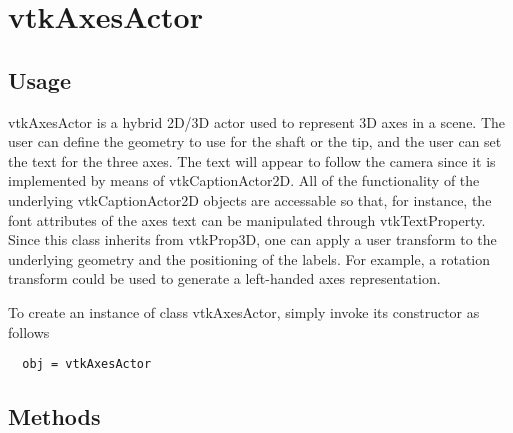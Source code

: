 \section{vtkAxesActor}

\subsection{Usage}

 vtkAxesActor is a hybrid 2D/3D actor used to represent 3D axes in a scene.
 The user can define the geometry to use for the shaft or the tip, and the
 user can set the text for the three axes. The text will appear to follow the
 camera since it is implemented by means of vtkCaptionActor2D.  All of the
 functionality of the underlying vtkCaptionActor2D objects are accessable so
 that, for instance, the font attributes of the axes text can be manipulated
 through vtkTextProperty. Since this class inherits from vtkProp3D, one can
 apply a user transform to the underlying geometry and the positioning of the
 labels. For example, a rotation transform could be used to generate a
 left-handed axes representation.

To create an instance of class vtkAxesActor, simply
invoke its constructor as follows
\begin{verbatim}
  obj = vtkAxesActor
\end{verbatim}
\subsection{Methods}

